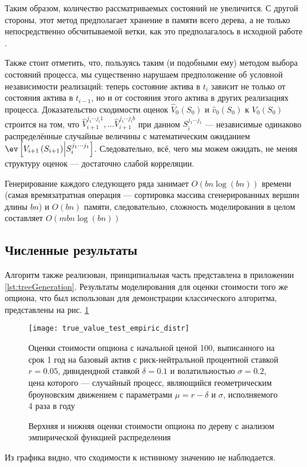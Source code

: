 		\par Таким образом, количество рассматриваемых состояний не увеличится. С другой стороны, этот метод предполагает хранение в памяти всего дерева, а не только непосредственно обсчитываемой ветки, как это предполагалось в исходной работе \cite{Broadie1997}.
		\par Также стоит отметить, что, пользуясь таким (и подобными ему) методом выбора состояний процесса, мы существенно нарушаем предположение об условной независимости реализаций: теперь состояние актива в $t_i$ зависит не только от состояния актива в $t_{i-1}$, но и от состояния этого актива в других реализациях процесса. Доказательство сходимости оценок $\hat{V}_0(S_0)$ и $\hat{v}_0(S_0)$ к $V_0(S_0)$ строится на том, что $\hat{V}_{i+1}^{j_1\cdots j_i 1}, \ldots \hat{V}_{i+1}^{j_1\cdots j_i b}$ при данном $S_i^{j_1\cdots j_1}$ --- независимые одинаково распределённые случайные величины с математическим ожиданием $\ev\left[V_{i+1}\left(S_{i+1}\right)\middle\vert S_i^{j_1\cdots j_1}\right]$. Следовательно, всё, чего мы можем ожидать, не меняя структуру оценок --- достаточно слабой корреляции.
		\par Генерирование каждого следующего ряда занимает $O\left(bn\log\left(bn\right)\right)$ времени (самая времязатратная операция --- сортировка массива сгенерированных вершин длины $bn$) и $O\left(bn\right)$ памяти, следовательно, сложность моделирования в целом составляет $O\left(mbn\log\left(bn\right)\right)$
		\subsection{Численные результаты}
		Алгоритм также реализован, принципиальная часть представлена в приложении \ref{lst:treeGeneration}. Результаты моделирования для оценки стоимости того же опциона, что был использован для демонстрации классического алгоритма, представлены на рис. \ref{fig:true_value_test_empiric_distr}
		\begin{figure}[h]
    	    \centering
    		\texttt{[image: true\_value\_test\_empiric\_distr]}
    		\caption{Верхняя и нижняя оценки стоимости опциона по дереву с анализом эмпирической функцией распределения}
    		\label{fig:true_value_test_empiric_distr}
    		\footnotesize{Оценки стоимости опциона с начальной ценой 100, выписанного на срок 1 год на базовый актив с риск-нейтральной процентной ставкой $r = 0.05$, дивидендной ставкой $\delta = 0.1$ и волатильностью $\sigma=0.2$, цена которого --- случайный процесс, являющийся геометрическим броуновским движением с параметрами $\mu = r - \delta$ и $\sigma$, исполняемого 4 раза в году}
	    \end{figure}
		Из графика видно, что сходимости к истинному значению не наблюдается.
